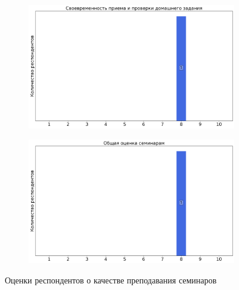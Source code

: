 \begin{figure}[H]
\begin{subfigure}[b]{0.45\textwidth}
                \includegraphics[width=\textwidth]{images/4 course/Защита информации/seminarists-marks-Колыбельников А.И.-2.png}
            \end{subfigure}
            \begin{subfigure}[b]{0.45\textwidth}
                \centering
                \includegraphics[width=\textwidth]{images/4 course/Защита информации/seminarists-marks-Колыбельников А.И.-3.png}
            \end{subfigure}	
            \caption{Оценки респондентов о качестве преподавания семинаров}
        \end{figure}

  
